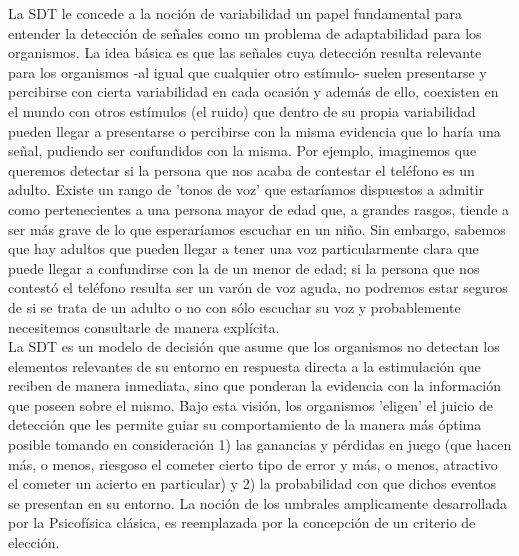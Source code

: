 La SDT le concede a la noción de variabilidad un papel fundamental para entender la detección de señales como un problema de adaptabilidad para los organismos. La idea básica es que las señales cuya detección resulta relevante para los organismos -al igual que cualquier otro estímulo- suelen presentarse y percibirse con cierta variabilidad en cada ocasión y además de ello, coexisten en el mundo con otros estímulos (el ruido) que dentro de su propia variabilidad pueden llegar a presentarse o percibirse con la misma evidencia que lo haría una señal, pudiendo ser confundidos con la misma. Por ejemplo, imaginemos que queremos detectar si la persona que nos acaba de contestar el teléfono es un adulto. Existe un rango de 'tonos de voz' que estaríamos dispuestos a admitir como pertenecientes a una persona mayor de edad que, a grandes rasgos, tiende a ser más grave de lo que esperaríamos escuchar en un niño. Sin embargo, sabemos que hay adultos que pueden llegar a tener una voz particularmente clara que puede llegar a confundirse con la de un menor de edad; si la persona que nos contestó el teléfono resulta ser un varón de voz aguda, no podremos estar seguros de si se trata de un adulto o no con sólo escuchar su voz y probablemente necesitemos consultarle de manera explícita.\\

La SDT es un modelo de decisión que asume que los organismos no detectan los elementos relevantes de su entorno en respuesta directa a la estimulación que reciben de manera inmediata, sino que ponderan la evidencia con la información que poseen sobre el mismo. Bajo esta visión, los organismos 'eligen' el juicio de detección que les permite guiar su comportamiento de la manera más óptima posible tomando en consideración 1) las ganancias y pérdidas en juego (que hacen más, o menos, riesgoso el cometer cierto tipo de error y más, o menos, atractivo el cometer un acierto en particular) y 2) la probabilidad con que dichos eventos se presentan en su entorno.  La noción de los umbrales amplicamente desarrollada por la Psicofísica clásica, es reemplazada por la concepción de un criterio de elección.\\ 

